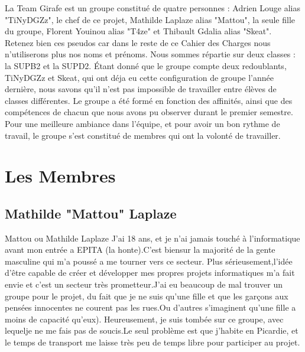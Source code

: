 \documentclass [11pt]{report}
\begin{document}
		La Team Girafe est  un groupe constitué de quatre personnes : Adrien Louge alias "TiNyDGZz", le chef de ce projet, Mathilde Laplaze alias "Mattou", la seule fille du groupe, Florent Youinou alias "T4ze" et Thibault Gdalia alias "Skeat". Retenez bien ces pseudos car dans le reste de ce Cahier des Charges nous n'utiliserons plus nos noms et pr\'enoms. Nous sommes r\'epartie sur deux classes : la SUPB2 et la SUPD2.  \'Etant donné que le groupe compte deux redoublants, TiNyDGZz et Skeat, qui ont d\'eja eu cette configuration de groupe l'ann\'ee derni\`ere, nous savons qu'il n'est pas impossible de travailler entre \'el\`eves de classes diff\'erentes. Le groupe a \'et\'e form\'e en fonction des affinit\'es, ainsi que des comp\'etences de chacun que nous avons pu observer durant le premier semestre. Pour une meilleure ambiance dans l'\'equipe, et pour avoir un bon rythme de travail, le groupe s'est constitué de membres qui ont la volont\'e de travailler. 
	
	
	
	\newpage

	\section { Les Membres }
		\subsection {Mathilde "Mattou" Laplaze}
			Mattou ou Mathilde Laplaze J'ai 18 ans, et je n'ai jamais touché à l'informatique avant mon entrée a EPITA (la honte).C'est biensur la majorité de la gente masculine qui m'a poussé a me tourner vers ce secteur. Plus sérieusement,l'idée d'être capable de créer et développer mes propres projets informatiques m'a fait envie et c'est un secteur très prometteur.J'ai eu beaucoup de mal trouver un groupe pour le projet, du fait que je ne suis qu'une fille et que les garçons aux pensées innocentes ne courent pas les rues.Ou d'autres s'imaginent qu'une fille a moins de capacité qu'eux). Heureusement, je suis tombée sur ce groupe, avec lequelje ne me fais pas de soucis.Le seul problème est que j'habite en Picardie, et le temps de transport me laisse très peu de temps libre pour participer au projet.\\\vspace{10mm}
	
		
\end{document}
